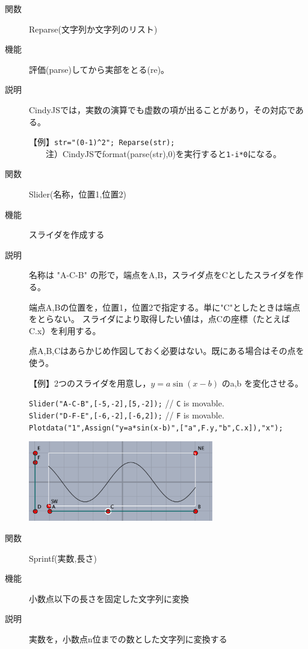 \documentclass[papersize,a4paper,10pt,uplatex]{jsarticle}
\begin{document}
\begin{description}
\vspace{\baselineskip}
\hypertarget{reparse}{}
\item[関数]Reparse(文字列か文字列のリスト)
\item[機能]評価(parse)してから実部をとる(re)。
\item[説明]CindyJSでは，実数の演算でも虚数の項が出ることがあり，その対応である。

【例】\verb|str="(0-1)^2"; Reparse(str);|\\
　　注）CindyJSでformat(parse(str),0)を実行すると\verb|1-i*0|になる。

\vspace{\baselineskip}
\hypertarget{slider}{}
\item[関数]Slider(名称，位置1,位置2)
\item[機能]スライダを作成する
\item[説明]名称は "A-C-B" の形で，端点をA,B，スライダ点をCとしたスライダを作る。

端点A,Bの位置を，位置1，位置2で指定する。単に"C"としたときは端点をとらない。
スライダにより取得したい値は，点Cの座標（たとえば C.x）を利用する。

点A,B,Cはあらかじめ作図しておく必要はない。既にある場合はその点を使う。

\vspace{\baselineskip}
【例】2つのスライダを用意し，$y=a\sin(x-b)$ のa,b を変化させる。

\verb|Slider("A-C-B",[-5,-2],[5,-2]);| // \verb|C| is movable.\\
\verb|Slider("D-F-E",[-6,-2],[-6,2]);| // \verb|F| is movable.\\
\verb|Plotdata("1",Assign("y=a*sin(x-b)",["a",F.y,"b",C.x]),"x"); |

\vspace{2mm}
\hspace{15mm}
\includegraphics[bb=0.00 0.00 445.02 193.01,height=35mm]{Fig/slider.pdf} 

\vspace{\baselineskip}
\hypertarget{sprintf}{}
\item[関数]Sprintf(実数,長さ)
\item[機能]小数点以下の長さを固定した文字列に変換
\item[説明]実数を，小数点n位までの数とした文字列に変換する


\end{description}
\end{document}
